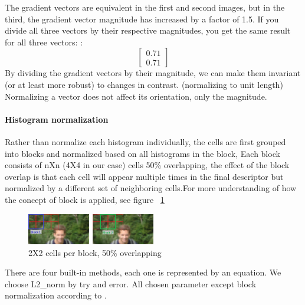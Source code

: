 The gradient vectors are equivalent in the first and second images, but in the third, the gradient vector magnitude has increased by a factor of 1.5. \newline
If you divide all three vectors by their respective magnitudes, you get the same result for all three vectors:
:\[ \begin{bmatrix}
0.71\\0.71
\end{bmatrix} \]
\newline
By dividing the gradient vectors by their magnitude, we can make them invariant (or at least more robust) to changes in contrast. (normalizing to unit length)
\newline Normalizing a vector does not affect its orientation, only the magnitude.
\paragraph{Histogram normalization} Rather than normalize each histogram individually, the cells are first grouped into blocks and normalized based on all histograms in the block, Each block consists of nXn (4X4 in our case) cells 50\% overlapping, the effect of the block overlap is that each cell will appear multiple times in the final descriptor but normalized by a different set of neighboring cells.For more understanding of how the concept of block is applied, see figure ~\ref{fig:block normalization}
\begin{figure}
	\centering
	\includegraphics[width=0.5\textwidth]{images/blocks.png}
	\caption{2X2 cells per block, 50\% overlapping}
	\label{fig:block normalization}
\end{figure}
There are four built-in methods, each one is represented by an equation.
\newline We choose L2\_norm by try and error.\newline
All chosen parameter except block normalization according to \cite{hog}.